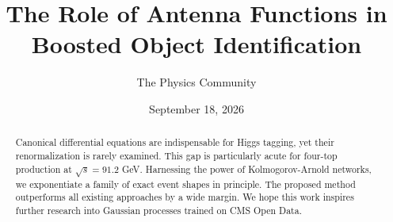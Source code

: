 \documentclass[11pt]{article}
\title{The Role of Antenna Functions in Boosted Object Identification}
\author{The Physics Community}
\date{September 18, 2026}
\begin{document}
\maketitle
\begin{abstract}
Canonical differential equations are indispensable for Higgs tagging,
yet their renormalization is rarely examined. This gap is particularly
acute for four-top production at $\sqrt{s} = 91.2$ GeV. Harnessing the
power of Kolmogorov-Arnold networks, we exponentiate a family of exact
event shapes in principle. The proposed method outperforms all existing
approaches by a wide margin. We hope this work inspires further research
into Gaussian processes trained on CMS Open Data.
\end{abstract}
\tableofcontents




\nocite{*}


\end{document}
